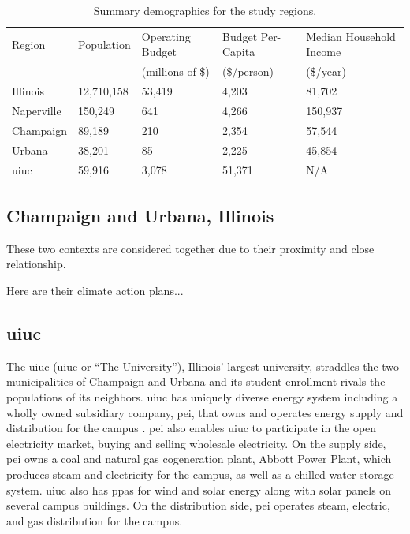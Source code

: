 \begin{table}[htbp!]
    \centering
    \caption{Summary demographics for the study regions.}
    \label{tab:demographics}
    \begin{tabular}{lllll}
        \toprule
        Region & Population & Operating Budget & Budget Per-Capita & Median
        Household Income \\
        & & (millions of \$) & (\$/person) &(\$/year) \\
        \midrule
        Illinois
        \cite{united_states_census_bureau_quickfacts_2024-3,sturm_illinois_2024}&
        12,710,158  & 53,419 & 4,203 & 81,702\\
        Naperville
        \cite{united_states_census_bureau_quickfacts_2024-2,munch_annual_2024} &
        150,249  & 641 & 4,266 & 150,937 \\
        Champaign
        \cite{united_states_census_bureau_quickfacts_2024,nees_adopted_2024} &
        89,189 & 210 & 2,354 & 57,544 \\
        Urbana \cite{united_states_census_bureau_quickfacts_2024-1,
        ho_city_2024}& 38,201 & 85 & 2,225 & 45,854 \\
        \ac{uiuc} \cite{data_usa_university_2022,
        university_of_illinois_system_fy_2024} & 59,916 & 3,078 & 51,371 & N/A
        \\
        \bottomrule
    \end{tabular}
\end{table}

\subsection{Champaign and Urbana, Illinois}
These two contexts are considered together due to their proximity and close
relationship. 

Here are their climate action plans...

\subsection{\acf{uiuc}} 

The \acl{uiuc} (\acs{uiuc} or ``The University''), Illinois' largest university,
straddles the two municipalities of Champaign and Urbana and its student
enrollment rivals the populations of its neighbors. \ac{uiuc} has uniquely
diverse energy system including a wholly owned subsidiary company, \ac{pei},
that owns and operates energy supply and distribution for the campus
\cite{affiliated_engineers_inc_utilities_2015}. \ac{pei} also enables \ac{uiuc}
to participate in the open electricity market, buying and selling wholesale
electricity. On the supply side, \ac{pei} owns a coal and natural gas
cogeneration plant, Abbott Power Plant, which produces steam and electricity for
the campus, as well as a chilled water storage system. \ac{uiuc} also has
\acp{ppa} for wind \cite{breitweiser_wind_2016} and solar energy
\cite{white_solar_2017, white_solar_2020} along with solar panels on several
campus buildings. On the distribution side, \ac{pei} operates steam, electric,
and gas distribution for the campus. 

